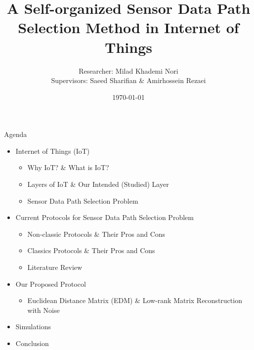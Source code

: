 \documentclass{beamer}
\title[Reinforcement Learning]{A Self-organized Sensor Data Path Selection Method in Internet of Things}
\author{Researcher: Milad Khademi Nori \\ Supervisors: Saeed Sharifian \& Amirhossein Rezaei}
\institute{Electrical Engineering Department at Amirkabir University of Technology}
\date{\today}
\begin{document}
\begin{frame}
\titlepage
\end{frame}


\begin{frame}[t]{Agenda} %

\begin{itemize}
\item Internet of Things (IoT)
		\begin{itemize}
		\item Why IoT? \& What is IoT?
		\item Layers of IoT \& Our Intended (Studied) Layer
		\item Sensor Data Path Selection Problem
		\end{itemize}		
\item Current Protocols for Sensor Data Path Selection Problem
		\begin{itemize}		
		\item Non-classic Protocols \& Their Pros and Cons
		\item Classics Protocols \& Their Pros and Cons
		\item Literature Review
		\end{itemize}		
\item Our Proposed Protocol
		\begin{itemize}
		\item Euclidean Distance Matrix (EDM) \& Low-rank Matrix Reconstruction with Noise
		\end{itemize}
\item Simulations
\item Conclusion
\end{itemize}
\end{frame}
\end{document}
